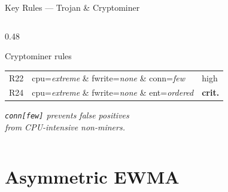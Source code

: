 \documentclass[aspectratio=169,12pt]{beamer}
\begin{document}
\begin{frame}{Key Rules — Trojan \& Cryptominer}
\begin{columns}[T]
\begin{column}{0.48\textwidth}
\begin{block}{Cryptominer rules}
\begin{tabular}{@{} c p{4.0cm} l @{}}
          R22 & cpu=\textit{extreme} \& fwrite=\textit{none}
              \& conn=\textit{few}        & high \\
          R24 & cpu=\textit{extreme} \& fwrite=\textit{none}
              \& ent=\textit{ordered}     & \textbf{crit.} \\
          \bottomrule
        \end{tabular}
      \end{block}
      \vspace{0.1em}
      \scriptsize\textit{\texttt{conn[few]} prevents false positives\\
      from CPU-intensive non-miners.}
    \end{column}
  \end{columns}
\end{frame}

\section{Asymmetric EWMA}
\end{document}
